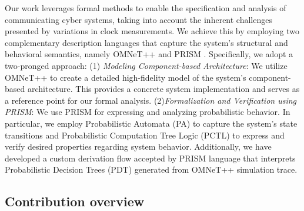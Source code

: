 Our work leverages formal methods to enable the specification and analysis of communicating cyber systems, taking into account the inherent challenges presented by variations in clock measurements. We achieve this by employing two complementary description languages that capture the system's structural and behavioral semantics, namely OMNeT++ \cite{omnet2008} and PRISM \cite{Kwiatkowskaprism2011}.  Specifically, we adopt a two-pronged approach: (1) \emph{Modeling Component-based Architecture}: We utilize OMNeT++ to create a detailed high-fidelity model of the system's component-based architecture. This provides a concrete system implementation and serves as a reference point for our formal analysis. (2)\emph{Formalization and Verification using PRISM}: We use PRISM for expressing and analyzing probabilistic behavior. In particular, we employ Probabilistic Automata (PA) to capture the system's state transitions and Probabilistic Computation Tree Logic (PCTL) \cite{hanssonlogic1994} to express and verify desired properties regarding system behavior. Additionally, we have developed a custom derivation flow accepted by PRISM language that interprets Probabilistic Decision Trees (PDT) generated from OMNeT++ simulation trace. 




\subsection{Contribution overview} 


